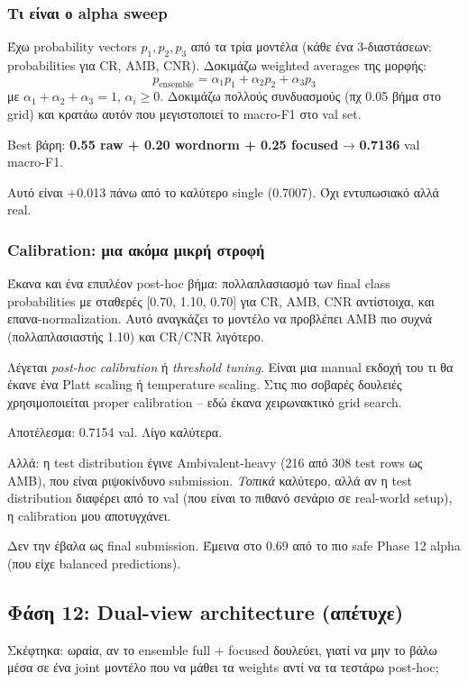 \documentclass[12pt]{fphw}
\begin{document}
\subsubsection{Τι είναι ο alpha sweep}

Έχω probability vectors $p_1, p_2, p_3$ από τα τρία μοντέλα (κάθε ένα 3-διαστάσεων: probabilities για CR, AMB, CNR). Δοκιμάζω weighted averages της μορφής:
\[
p_{\text{ensemble}} = \alpha_1 p_1 + \alpha_2 p_2 + \alpha_3 p_3
\]
με $\alpha_1 + \alpha_2 + \alpha_3 = 1$, $\alpha_i \geq 0$. Δοκιμάζω πολλούς συνδυασμούς (πχ 0.05 βήμα στο grid) και κρατάω αυτόν που μεγιστοποιεί το macro-F1 στο val set.

Best βάρη: \textbf{0.55 raw + 0.20 wordnorm + 0.25 focused} → \textbf{0.7136} val macro-F1.

Αυτό είναι +0.013 πάνω από το καλύτερο single (0.7007). Όχι εντυπωσιακό αλλά real.

\subsubsection{Calibration: μια ακόμα μικρή στροφή}

Έκανα και ένα επιπλέον post-hoc βήμα: πολλαπλασιασμό των final class probabilities με σταθερές [0.70, 1.10, 0.70] για CR, AMB, CNR αντίστοιχα, και επανα-normalization. Αυτό αναγκάζει το μοντέλο να προβλέπει AMB πιο συχνά (πολλαπλασιαστής 1.10) και CR/CNR λιγότερο.

Λέγεται \emph{post-hoc calibration} ή \emph{threshold tuning}. Είναι μια manual εκδοχή του τι θα έκανε ένα Platt scaling ή temperature scaling. Στις πιο σοβαρές δουλειές χρησιμοποιείται proper calibration -- εδώ έκανα χειρωνακτικό grid search.

Αποτέλεσμα: 0.7154 val. Λίγο καλύτερα.

Αλλά: η test distribution έγινε Ambivalent-heavy (216 από 308 test rows ως AMB), που είναι ριψοκίνδυνο submission. \emph{Τοπικά} καλύτερο, αλλά αν η test distribution διαφέρει από το val (που είναι το πιθανό σενάριο σε real-world setup), η calibration μου αποτυγχάνει.

Δεν την έβαλα ως final submission. Έμεινα στο 0.69 από το πιο safe Phase 12 alpha (που είχε balanced predictions).

\subsection{Φάση 12: Dual-view architecture (απέτυχε)}

Σκέφτηκα: ωραία, αν το ensemble full + focused δουλεύει, γιατί να μην το βάλω μέσα σε ένα joint μοντέλο που να μάθει τα weights αντί να τα τεστάρω post-hoc;
\end{document}
